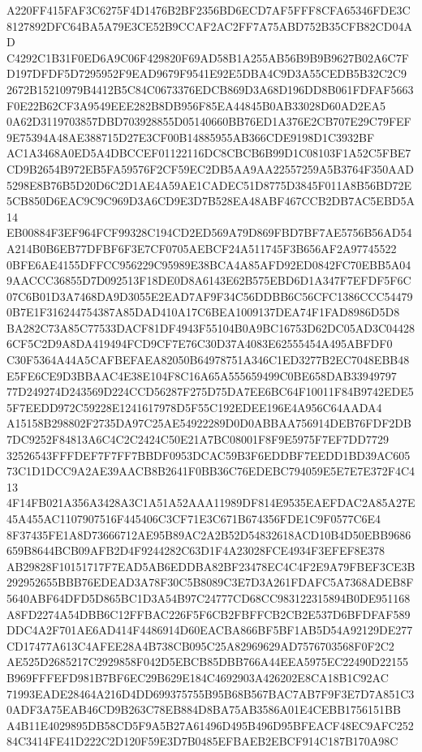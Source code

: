 \documentclass[UTF8,fontset=fandol,zihao=-4,a4paper]{ctexart}
\begin{document}
{{A220FF415FAF3C6275F4D1476B2BF2356BD6ECD7AF5FFF8CFA65346FDE3C8127892DFC64BA5A79E3CE52B9CCAF2AC2FF7A75ABD752B35CFB82CD04AD
C4292C1B31F0ED6A9C06F429820F69AD58B1A255AB56B9B9B9627B02A6C7FD197DFDF5D7295952F9EAD9679F9541E92E5DBA4C9D3A55CEDB5B32C2C9
2672B15210979B4412B5C84C0673376EDCB869D3A68D196DD8B061FDFAF5663F0E22B62CF3A9549EEE282B8DB956F85EA44845B0AB33028D60AD2EA5
0A62D3119703857DBD703928855D05140660BB76ED1A376E2CB707E29C79FEF9E75394A48AE388715D27E3CF00B14885955AB366CDE9198D1C3932BF
AC1A3468A0ED5A4DBCCEF01122116DC8CBCB6B99D1C08103F1A52C5FBE7CD9B2654B972EB5FA59576F2CF59EC2DB5AA9AA22557259A5B3764F350AAD
5298E8B76B5D20D6C2D1AE4A59AE1CADEC51D8775D3845F011A8B56BD72E5CB850D6EAC9C9C969D3A6CD9E3D7B528EA48ABF467CCB2DB7AC5EBD5A14
EB00884F3EF964FCF99328C194CD2ED569A79D869FBD7BF7AE5756B56AD54A214B0B6EB77DFBF6F3E7CF0705AEBCF24A511745F3B656AF2A97745522
0BFE6AE4155DFFCC956229C95989E38BCA4A85AFD92ED0842FC70EBB5A049AACCC36855D7D092513F18DE0D8A6143E62B575EBD6D1A347F7EFDF5F6C
07C6B01D3A7468DA9D3055E2EAD7AF9F34C56DDBB6C56CFC1386CCC544790B7E1F316244754387A85DAD410A17C6BEA1009137DEA74F1FAD8986D5D8
BA282C73A85C77533DACF81DF4943F55104B0A9BC16753D62DC05AD3C044286CF5C2D9A8DA419494FCD9CF7E76C30D37A4083E62555454A495ABFDF0
C30F5364A44A5CAFBEFAEA82050B64978751A346C1ED3277B2EC7048EBB48E5FE6CE9D3BBAAC4E38E104F8C16A65A555659499C0BE658DAB33949797
77D249274D243569D224CCD56287F275D75DA7EE6BC64F10011F84B9742EDE55F7EEDD972C59228E1241617978D5F55C192EDEE196E4A956C64AADA4
A15158B298802F2735DA97C25AE54922289D0D0ABBAA756914DEB76FDF2DB7DC9252F84813A6C4C2C2424C50E21A7BC08001F8F9E5975F7EF7DD7729
32526543FFFDEF7F7FF7BBDF0953DCAC59B3F6EDDBF7EEDD1BD39AC60573C1D1DCC9A2AE39AACB8B2641F0BB36C76EDEBC794059E5E7E7E372F4C413
4F14FB021A356A3428A3C1A51A52AAA11989DF814E9535EAEFDAC2A85A27E45A455AC1107907516F445406C3CF71E3C671B674356FDE1C9F0577C6E4
8F37435FE1A8D73666712AE95B89AC2A2B52D54832618ACD10B4D50EBB9686659B8644BCB09AFB2D4F9244282C63D1F4A23028FCE4934F3EFEF8E378
AB29828F10151717F7EAD5AB6EDDBA82BF23478EC4C4F2E9A79FBEF3CE3B292952655BBB76EDEAD3A78F30C5B8089C3E7D3A261FDAFC5A7368ADEB8F
5640ABF64DFD5D865BC1D3A54B97C24777CD68CC983122315894B0DE951168A8FD2274A54DBB6C12FFBAC226F5F6CB2FBFFCB2CB2E537D6BFDFAF589
DDC4A2F701AE6AD414F4486914D60EACBA866BF5BF1AB5D54A92129DE277CD17477A613C4AFEE28A4B738CB095C25A82969629AD7576703568F0F2C2
AE525D2685217C2929858F042D5EBCB85DBB766A44EEA5975EC22490D22155B969FFFEFD981B7BF6EC29B629E184C4692903A426202E8CA18B1C92AC
71993EADE28464A216D4DD699375755B95B68B567BAC7AB7F9F3E7D7A851C30ADF3A75EAB46CD9B263C78EB884D8BA75AB3586A01E4CEBB1756151BB
A4B11E4029895DB58CD5F9A5B27A61496D495B496D95BFEACF48EC9AFC25284C3414FE41D222C2D120F59E3D7B0485EFBAEB2EBCF914C187B170A98C
}}
\end{document}
